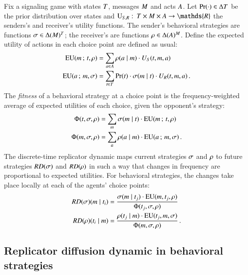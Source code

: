 Fix a signaling game with states $T$, messages $M$ and
acts $A$. Let $\Pr(\cdot) \in \Delta{\ensuremath{T}}$ be the prior
distribution over states and $\Util_{\sen,\rec} \mycolon \States
\times \Messgs \times \Acts \rightarrow \mathds{R}$ the senders's and
receiver's utility functions. The sender's behavioral strategies are
functions $\sigma \in \Delta(M)^T$; the receiver's are
functions $\rho \in \Delta(A)^M$. Define the expected
utility of actions in each choice point are defined as usual:
\begin{align*}
  \mathrm{EU}(m \thinspace ; \thinspace t, \rho) & = \sum_{a \in A}
  \rho(a \mid m) \cdot U_S(t, m, a) \\
  \mathrm{EU}(a \thinspace ; \thinspace m, \sigma) & = \sum_{t \in
    T} \Pr(t) \cdot \sigma(m \mid t) \cdot
  U_R(t, m, a) \,.
\end{align*}
The \emph{fitness} of a behavioral strategy at a choice point is the
frequency-weighted average of expected utilities of each choice, given
the opponent's strategy:
\begin{align*}
  \Phi(t,\sigma, \rho) & = \sum_{m} \sigma(m \mid t) \cdot
\mathrm{EU}(m \thinspace ; \thinspace t,\rho) \\
\Phi(m,\sigma, \rho) & = \sum_{a} \rho(a \mid m)
\cdot \mathrm{EU}(a \thinspace ; \thinspace m,\sigma)\,.
\end{align*}
The discrete-time replicator dynamic maps current strategies $\sigma$
and $\rho$ to future strategies $RD(\sigma)$ and $RD(\rho)$ in
such a way that changes in frequency are proportional to expected
utilities. For behavioral strategies, the changes take place locally
at each of the agents' choice points:
\begin{align*}
  RD(\sigma)(m \mid t_i) & = \frac{\sigma(m \mid t_j) \cdot
    \mathrm{EU}(m,t_j,\rho)} {\Phi(t_j,\sigma, \rho)} \\
    RD(\rho)(t_i \mid m) & = \frac{\rho(t_j \mid m) \cdot
    \mathrm{EU}(t_j,m,\sigma)} {\Phi(m,\sigma, \rho)}  \,.
\end{align*}


\subsection{Replicator diffusion dynamic in behavioral strategies}

